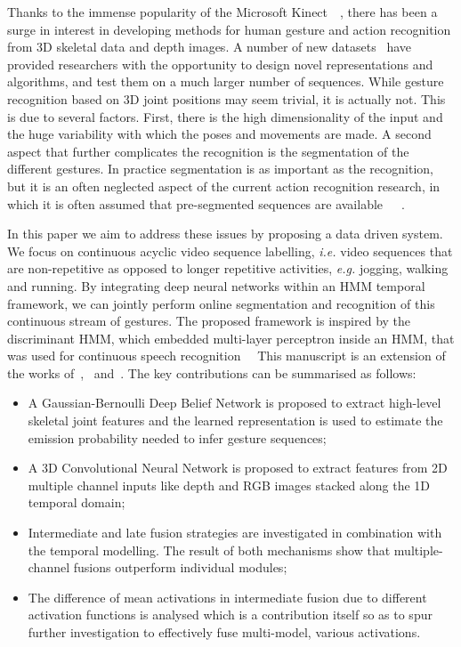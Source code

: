 Thanks to the immense popularity of the Microsoft Kinect~\cite{shotton2011real}~\cite{lingshao2}, there has been a surge in interest in developing methods for human gesture and action recognition from 3D skeletal data and depth images.
A number of new datasets~\cite{ICMI,fothergill2012instructing,guyon2012chalearn,wang2012mining} have provided researchers with the opportunity to design novel representations and algorithms, and test them on a much larger number of sequences.
While gesture recognition based on 3D joint positions may seem trivial, it is actually not. This is due to several factors. First, there is the high dimensionality of the input and the huge variability with which the poses and movements are made.
A second aspect that further complicates the recognition is the segmentation of the different gestures. In practice segmentation is as important as the recognition, but it is an often neglected aspect of the current action recognition research, in which it is often assumed that  pre-segmented sequences are available~\cite{laptev2005space}~\cite{marszalek09}~\cite{Kuehne11}.

In this paper we aim to address these issues by proposing a data driven system. We focus on continuous acyclic video sequence labelling, \emph{i.e.} video sequences that are non-repetitive as opposed to longer repetitive activities, \textit{e.g.} jogging, walking and running. By integrating deep neural networks within an HMM temporal framework, we can jointly perform online segmentation and recognition of this continuous stream of gestures. The proposed framework is inspired by the discriminant HMM, which embedded multi-layer perceptron inside an HMM, that was used for continuous speech recognition~\cite{renals1994connectionist}~\cite{bourlard1994connectionist}
This manuscript is an extension of the works of~\cite{diwucvpr14},~\cite{wu2014deep} and~\cite{lio2014deep}.
The key contributions can be summarised as follows:
\begin{itemize}
\item A Gaussian-Bernoulli Deep Belief Network is proposed to extract high-level skeletal joint features and the learned representation is used to estimate the emission probability needed to infer gesture sequences;
\item A 3D Convolutional Neural Network  is proposed to extract features from 2D multiple channel inputs like  depth and RGB images stacked along the 1D temporal domain;
\item Intermediate and late fusion strategies are investigated in combination with the temporal modelling. The result of both mechanisms show that multiple-channel fusions outperform individual modules;
\item The difference of mean activations in intermediate fusion due to different activation functions is analysed which is a contribution itself so as to spur further investigation to effectively fuse multi-model, various activations.
\end{itemize}

